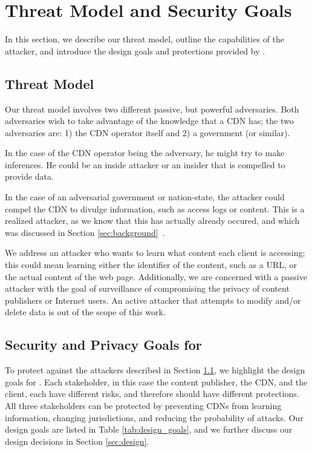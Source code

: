 \section{Threat Model and Security Goals}
\label{sec:threat}
In this section, we describe our threat model, outline the capabilities of the 
attacker, and introduce the design goals and protections provided by \system{}.

\subsection{Threat Model}
\label{sec:attacker}
Our threat model involves two different passive, but powerful adversaries.  Both adversaries 
wish to take advantage of the knowledge that a CDN has; the two adversaries are: 1) the CDN operator 
itself and 2) a government (or similar).  

In the case of the CDN operator being the adversary, he might try to make inferences.  
He could be an inside attacker or an insider that is compelled to provide data. 

In the case of an adversarial government or nation-state, the attacker could compel 
the CDN to divulge information, such as access logs or content.  This is a realized 
attacker, as we know that this has actually already occured, and which was discussed 
in Section \ref{sec:background}~\cite{cloudflare_nsl}.

We address an attacker who wants to learn what content each client is accessing; this 
could mean learning either the identifier of the content, such as a URL, or the actual 
content of the web page.  Additionally, we are concerned with a passive attacker with 
the goal of surveillance of compromising the privacy of content publishers or Internet 
users.  An active attacker that attempts to modify and/or delete data is out of the 
scope of this work.

\subsection{Security and Privacy Goals for \system{}}
\label{sec:goals}
To protect against the attackers described in Section 
\ref{sec:attacker}, we highlight the design goals for \system{}. 
Each stakeholder, in this case the content publisher, the CDN, and the client, each have 
different risks, and therefore should have different protections.  All three stakeholders 
can be protected by preventing CDNs from learning information, changing jurisdictions, and 
reducing the probability of attacks.  Our design goals are listed in Table \ref{tab:design_goals}, 
and we further discuss our design decisions in Section \ref{sec:design}.

